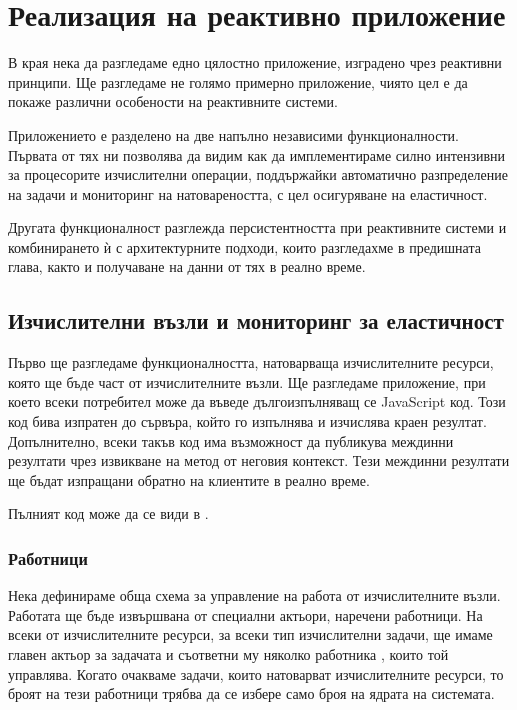 \chapter{Реализация на реактивно приложение}

В края нека да разгледаме едно цялостно приложение, изградено чрез реактивни принципи. Ще разгледаме не голямо примерно приложение, чиято цел е да покаже различни особености на реактивните системи.

Приложението е разделено на две напълно независими функционалности. Първата от тях ни позволява да видим как да имплементираме силно интензивни за процесорите изчислителни операции, поддържайки автоматично разпределение на задачи и мониторинг на натовареността, с цел осигуряване на еластичност.

Другата функционалност разглежда персистентността при реактивните системи и комбинирането ѝ с архитектурните подходи, които разгледахме в предишната глава, както и получаване на данни от тях в реално време.

\section{Изчислителни възли и мониторинг за еластичност}

Първо ще разгледаме функционалността, натоварваща изчислителните ресурси, която ще бъде част от изчислителните възли. Ще разгледаме приложение, при което всеки потребител може да въведе дългоизпълняващ се JavaScript код. Този код бива изпратен до сървъра, който го изпълнява и изчислява краен резултат. Допълнително, всеки такъв код има възможност да публикува междинни резултати чрез извикване на  метод от неговия контекст. Тези междинни резултати ще бъдат изпращани обратно на клиентите в реално време.

Пълният код може да се види в .

\subsection{Работници}

Нека дефинираме обща схема за управление на работа от изчислителните възли. Работата ще бъде извършвана от специални актьори, наречени работници. На всеки от изчислителните ресурси, за всеки тип изчислителни задачи, ще имаме главен актьор за задачата  и съответни му няколко работника , които той управлява. Когато очакваме задачи, които натоварват изчислителните ресурси, то броят на тези работници трябва да се избере само броя на ядрата на системата.
 
